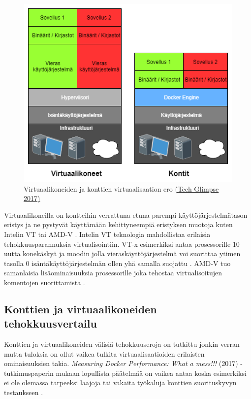 \documentclass[finnish,gradu]{tktltiki3}
\begin{document}
\begin{figure}[h]
    \centering
    \includegraphics[width=1\textwidth]{images/Container-vs-VMs.png}
    \caption{Virtuaalikoneiden ja konttien virtuaalisaation ero \href{https://techglimpse.com/docker-installation-tutorial-centos/}{(Tech Glimpse 2017)}}
    \label{fig:c-vs-vm}
\end{figure}

Virtuaalikoneilla on kontteihin verrattuna etuna parempi käyttöjärjestelmätason eristys ja ne pystyvät käyttämään kehittyneempiä eristyksen muotoja kuten Intelin VT tai AMD-V \cite{openvz-xen-kvm}. Intelin VT teknologia mahdollistaa erilaisia tehokkuusparannuksia virtualisointiin. VT-x esimerkiksi antaa prosessorille 10 uutta konekäskyä \cite{vt-x-overview} ja moodin jolla vieraskäyttöjärjestelmä voi suorittaa ytimen tasolla 0 isäntäkäyttöjärjestelmän ollen yhä samalla suojattu \cite{vt-x-analysis}. AMD-V tuo samanlaisia lisäominaisuuksia prosessorille joka tehostaa virtualisoitujen komentojen suorittamista \cite{amd-v-snippet}.

\subsection{Konttien ja virtuaalikoneiden tehokkuusvertailu}

Konttien ja virtuaalikoneiden välisiä tehokkuuseroja on tutkittu jonkin verran mutta tuloksia on ollut vaikea tulkita virtuaalisaatioiden erilaisten ominaisuuksien takia. \textit{Measuring Docker Performance: What a mess!!!} (2017) -tutkimuspaperin mukaan lopullista päätelmää on vaikea antaa koska esimerkiksi ei ole olemassa tarpeeksi laajoja tai vakaita työkaluja konttien suorituskyvyn testaukseen \cite{docker-mess}. 
\end{document}
